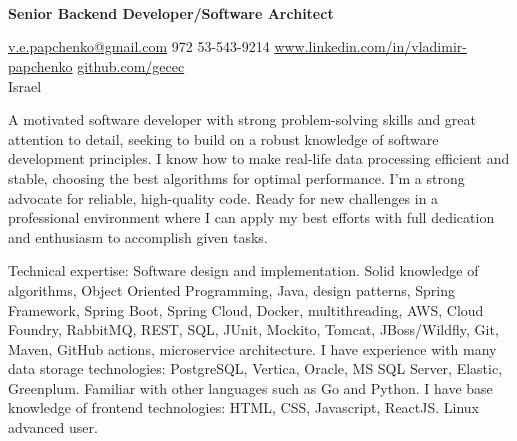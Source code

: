 \documentclass[10pt,a4paper]{article}
\begin{document}
\sloppy  %


\\\\\\
{\bf Senior Backend Developer/Software Architect}

\nobreakvspace{0.3em}  %

\noindent\href{mailto:v.e.papchenko.at.gmail.dot.com}{v.e.papchenko\mbox{}@\mbox{}gmail.com}\sbull
\textsmaller{+}972 53-543-9214\sbull
\href{https://www.linkedin.com/in/vladimir-papchenko}{www.linkedin.com/in/vladimir-papchenko}\sbull
\href{https://github.com/gecec}{github.com/gecec}
\\
Israel

\spacedhrule{0.9em}{-0.4em}  %


\inlineheadsection
\noindent
{}
A motivated software developer with strong problem-solving skills and great attention to detail, seeking to build on a robust knowledge of software development principles. I know how to make real-life data processing efficient and stable, choosing the best algorithms for optimal performance. I'm a strong advocate for reliable, high-quality code. Ready for new challenges in a professional environment where I can apply my best efforts with full dedication and enthusiasm to accomplish given tasks.

\spacedhrule{0.2em}{-0.3em}

\inlineheadsection  %
  {Technical expertise:}
  {Software design and implementation. Solid knowledge of algorithms, Object Oriented Programming, Java, design patterns, Spring Framework, Spring Boot, Spring Cloud, Docker, multithreading, AWS, Cloud Foundry, RabbitMQ, REST, SQL, JUnit, Mockito, Tomcat, JBoss/Wildfly, Git, Maven, GitHub actions, microservice architecture. I have experience with many data storage technologies: PostgreSQL, Vertica, Oracle, MS SQL Server, Elastic, Greenplum. Familiar with other languages such as Go and Python. I have base knowledge of frontend technologies: HTML, CSS, Javascript, ReactJS. Linux advanced user.}
\end{document}
